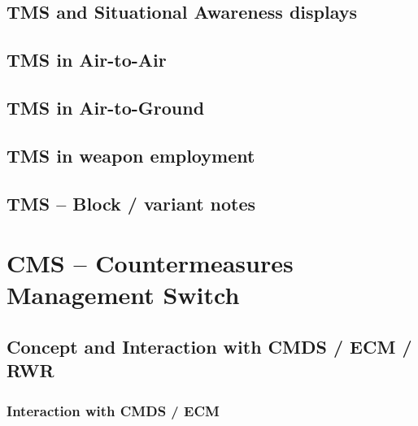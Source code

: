\documentclass[11pt, a4paper, twoside]{report}
\begin{document}
\section{TMS and Situational Awareness displays}

\section{TMS in Air-to-Air}

\section{TMS in Air-to-Ground}

\section{TMS in weapon employment}

\section{TMS -- Block / variant notes}

\newpage

\chapter{CMS -- Countermeasures Management Switch}


\section{Concept and Interaction with CMDS / ECM / RWR}

\subsection{Interaction with CMDS / ECM}

\end{document}
